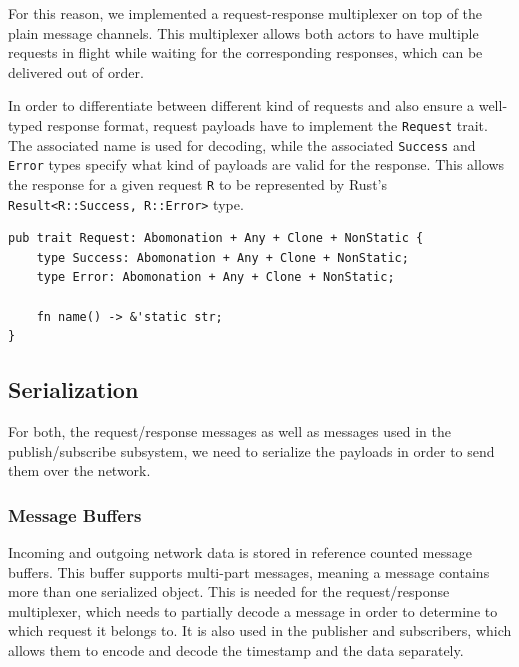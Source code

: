 For this reason, we implemented a request-response multiplexer on
top of the plain message channels. This multiplexer allows both actors to have
multiple requests in flight while waiting for the corresponding responses,
which can be delivered out of order.

In order to differentiate between different kind of requests and also ensure a
well-typed response format, request payloads have to implement the \lstinline{Request}
trait. The associated name is used for decoding, while the associated \lstinline{Success}
and \lstinline{Error} types specify what kind of payloads are valid for the response.
This allows the response for a given request \lstinline{R} to be represented by
Rust's \lstinline{Result<R::Success, R::Error>} type.

\begin{lstlisting}[caption={[Request trait]In order for a type to be used as a
request message, it needs to implement the \lstinline{Request} trait. The name allows
request handlers to differentiate between different types of requests, while the associated
types forces them to issue well-formed responses.
The trait bounds are explained in section \ref{sec:serialization}.}]
pub trait Request: Abomonation + Any + Clone + NonStatic {
    type Success: Abomonation + Any + Clone + NonStatic;
    type Error: Abomonation + Any + Clone + NonStatic;

    fn name() -> &'static str;
}
\end{lstlisting}

\subsection{Serialization} \label{sec:serialization}

For both, the request/response messages as well as messages used in the publish/subscribe
subsystem, we need to serialize the payloads in order to send them over the network.

\subsubsection{Message Buffers}

Incoming and outgoing network data is stored in reference counted message buffers.
This buffer supports multi-part messages, meaning a message contains more than
one serialized object. This is needed for the request/response multiplexer, which
needs to partially decode a message in order to determine to which request it
belongs to. It is also used in the publisher and subscribers, which allows them
to encode and decode the timestamp and the data separately.

